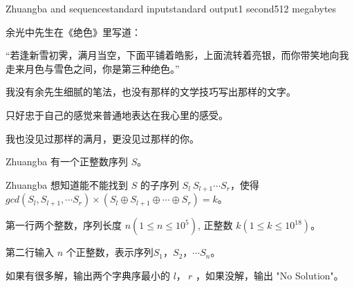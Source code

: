 \begin{problem}{Zhuangba and sequence}{standard input}{standard output}{1 second}{512 megabytes}

余光中先生在《绝色》里写道：
    
“若逢新雪初霁，满月当空，下面平铺着皓影，上面流转着亮银，而你带笑地向我走来月色与雪色之间，你是第三种绝色。”
    
我没有余先生细腻的笔法，也没有那样的文学技巧写出那样的文字。    
    
只好忠于自己的感觉来普通地表达在我心里的感受。
        
我也没见过那样的满月，更没见过那样的你。

Zhuangba 有一个正整数序列 $S$。

Zhuangba 想知道能不能找到 $S$ 的子序列 $S_l \ S_{l+1}\cdots S_r$，使得 $gcd(S_l,S_{l+1},\cdots S_r)\times (S_l \oplus S_{l+1} \oplus \cdots \oplus S_{r}) = k$。

\InputFile

第一行两个整数，序列长度 $n(1\le n \le 10^5)$, 正整数 $k(1 \le k \le 10^{18})$。

第二行输入 $n$ 个正整数，表示序列$S_1，S_2，\cdots S_n$。
\OutputFile

如果有很多解，输出两个字典序最小的 $ l ，\ r$ ，如果没解，输出 "No Solution"。

\Example

\begin{example}
%
%
\end{example}

\end{problem}
